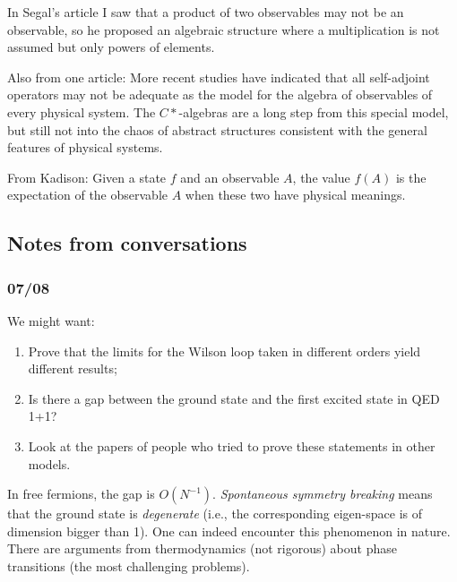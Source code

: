 In Segal's article I saw that a product of two observables may not be an observable, so he proposed an algebraic structure where a multiplication is not assumed but only powers of elements.

Also from one article:
More recent studies have indicated that all self-adjoint operators may not be adequate as the model for the algebra of observables of every physical system. The $C*$-algebras are a long step from this special model, but still not into the chaos of abstract structures consistent with the general features of physical systems. 

From Kadison:
Given a state $f$ and an observable $A$, the value $f(A)$ is the expectation of the observable $A$ when these two have physical meanings.

\subsection{Notes from conversations}
\subsubsection{07/08}
We might want:
\begin{enumerate}
\item Prove that the limits for the Wilson loop taken in different orders yield different results;
\item Is there a gap between the ground state and the first excited state in QED 1+1?
\item Look at the papers of people who tried to prove these statements in other models.
\end{enumerate}
In free fermions, the gap is $O(N^{-1})$. \emph{Spontaneous symmetry breaking} means that the ground state is \emph{degenerate} (i.e., the corresponding eigen-space is of dimension bigger than 1). One can indeed encounter this phenomenon in nature. There are arguments from thermodynamics (not rigorous) about phase transitions (the most challenging problems).